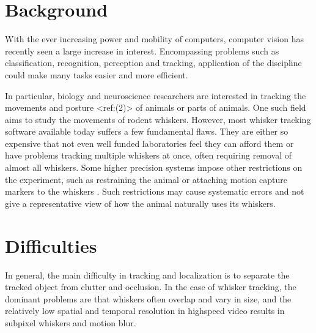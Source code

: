 \section{Background}





With the ever increasing power and mobility of computers, computer vision has recently seen a large increase in interest. 
Encompassing problems such as classification, recognition, perception and tracking, application of the discipline could make many tasks easier and more efficient.

In particular, biology and neuroscience researchers are interested in tracking the movements and posture <ref:(2)> of animals or parts of animals.
One such field aims to study the movements of rodent whiskers. However, most whisker tracking software available today suffers a few fundamental flaws.
They are either so expensive that not even well funded laboratories feel they can afford them or have problems tracking multiple whiskers at once, often requiring removal of almost all whiskers. 
Some higher precision systems impose other restrictions on the experiment, such as restraining the animal or attaching motion 
capture markers to the whiskers \cite{BadExample1}. Such restrictions may cause systematic errors and not give 
a representative view of how the animal naturally uses its whiskers.

\section{Difficulties}
In general, the main difficulty in tracking and localization is to separate the tracked object from clutter
and occlusion. In the case of whisker tracking, the dominant problems are that whiskers often overlap and vary in size, 
and the relatively low spatial and temporal resolution\cite{WhiskerVideography} in highspeed video results in subpixel whiskers and motion blur.

